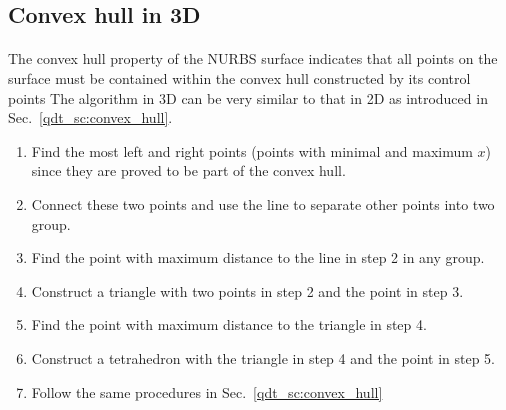 \subsection{Convex hull in 3D}
\label{oct_sec:convex_hull}
\paragraph{}
The convex hull property of the NURBS surface indicates that all points on the surface must be contained within the convex hull constructed by its control points \citep{SELIMOVIC2009772}
The algorithm in 3D can be very similar to that in 2D as introduced in Sec.~\ref{qdt_sc:convex_hull}.
\begin{enumerate}
    \item Find the most left and right points (points with minimal and maximum $x$) since they are proved to be part of the convex hull.
    \item Connect these two points and use the line to separate other points into two group.
    \item Find the point with maximum distance to the line in step 2 in any group.
    \item Construct a triangle with two points in step 2 and the point in step 3.
    \item Find the point with maximum distance to the triangle in step 4. %
    \item Construct a tetrahedron with the triangle in step 4 and the point in step 5.
    \item Follow the same procedures in Sec.~\ref{qdt_sc:convex_hull}
\end{enumerate}